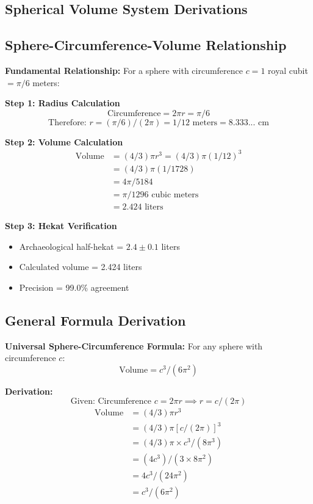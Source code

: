 \documentclass[11pt]{article}
\begin{document}
\subsection{Spherical Volume System Derivations}

\subsection{Sphere-Circumference-Volume Relationship}
\textbf{Fundamental Relationship:} For a sphere with circumference $c = 1$ royal cubit $= \pi/6$ meters:

\textbf{Step 1: Radius Calculation}
\[ \text{Circumference} = 2\pi r = \pi/6 \]
\[ \text{Therefore: } r = (\pi/6)/(2\pi) = 1/12 \text{ meters} = 8.333... \text{ cm} \]

\textbf{Step 2: Volume Calculation}
\begin{align*}
\text{Volume} &= (4/3)\pi r^3 = (4/3)\pi(1/12)^3 \\
             &= (4/3)\pi(1/1728) \\
             &= 4\pi/5184 \\
             &= \pi/1296 \text{ cubic meters} \\
             &= 2.424 \text{ liters}
\end{align*}

\textbf{Step 3: Hekat Verification}
\begin{itemize}
    \item Archaeological half-hekat = $2.4 \pm 0.1$ liters
    \item Calculated volume = 2.424 liters
    \item Precision = 99.0\% agreement
\end{itemize}

\subsection{General Formula Derivation}
\textbf{Universal Sphere-Circumference Formula:} For any sphere with circumference $c$:
\[ \text{Volume} = c^3/(6\pi^2) \]

\textbf{Derivation:}
\[ \text{Given: Circumference } c = 2\pi r \implies r = c/(2\pi) \]
\begin{align*}
\text{Volume} &= (4/3)\pi r^3 \\
             &= (4/3)\pi[c/(2\pi)]^3 \\
             &= (4/3)\pi \times c^3/(8\pi^3) \\
             &= (4c^3)/(3 \times 8\pi^2) \\
             &= 4c^3/(24\pi^2) \\
             &= c^3/(6\pi^2)
\end{align*}
\end{document}
